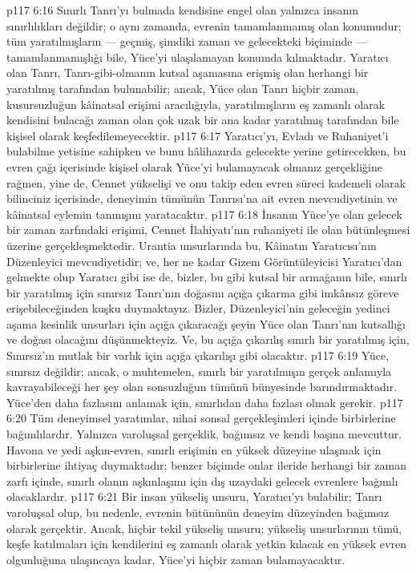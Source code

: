 \vs p117 6:16 Sınırlı Tanrı’yı bulmada kendisine engel olan yalnızca insanın sınırlılıkları değildir; o aynı zamanda, evrenin tamamlanmamış olan konumudur; tüm yaratılmışların --- geçmiş, şimdiki zaman ve gelecekteki biçiminde --- tamamlanmamışlığı bile, Yüce’yi ulaşılamayan konumda kılmaktadır. Yaratıcı olan Tanrı, Tanrı\hyp{}gibi\hyp{}olmanın kutsal aşamasına erişmiş olan herhangi bir yaratılmış tarafından bulunabilir; ancak, Yüce olan Tanrı hiçbir zaman, kusursuzluğun kâinatsal erişimi aracılığıyla,  yaratılmışların eş zamanlı olarak kendisini bulacağı zaman olan çok uzak bir ana kadar  yaratılmış tarafından bile kişisel olarak keşfedilemeyecektir.
\vs p117 6:17 Yaratıcı’yı, Evladı ve Ruhaniyet’i bulabilme yetisine sahipken ve bunu hâlihazırda gelecekte yerine getirecekken, bu evren çağı içerisinde kişisel olarak Yüce’yi bulamayacak olmanız gerçekliğine rağmen, yine de, Cennet yükselişi ve onu takip eden evren süreci kademeli olarak bilinciniz içerisinde, deneyimin tümünün Tanrısı’na ait evren mevcudiyetinin ve kâinatsal eylemin tanınışını yaratacaktır.
\vs p117 6:18 İnsanın Yüce’ye olan gelecek bir zaman zarfındaki erişimi, Cennet İlahiyatı’nın ruhaniyeti ile olan bütünleşmesi üzerine gerçekleşmektedir. Urantia unsurlarında bu, Kâinatın Yaratıcısı’nın Düzenleyici mevcudiyetidir; ve, her ne kadar Gizem Görüntüleyicisi Yaratıcı’dan gelmekte olup Yaratıcı gibi ise de, bizler, bu gibi kutsal bir armağanın bile, sınırlı bir yaratılmış için sınırsız Tanrı’nın doğasını açığa çıkarma gibi imkânsız göreve erişebileceğinden kuşku duymaktayız. Bizler, Düzenleyici’nin geleceğin yedinci aşama kesinlik unsurları için açığa çıkaracağı şeyin Yüce olan Tanrı’nın kutsallığı ve doğası olacağını düşünmekteyiz. Ve, bu açığa çıkarılış sınırlı bir yaratılmış için, Sınırsız’ın mutlak bir varlık için açığa çıkarılışı gibi olacaktır.
\vs p117 6:19 Yüce, sınırsız değildir; ancak, o muhtemelen, sınırlı bir yaratılmışın gerçek anlamıyla kavrayabileceği her şey olan sonsuzluğun tümünü bünyesinde barındırmaktadır. Yüce’den daha fazlasını anlamak için, sınırlıdan daha fazlası olmak gerekir.
\vs p117 6:20 Tüm deneyimsel yaratımlar, nihai sonsal gerçekleşimleri içinde birbirlerine bağımlılardır. Yalnızca varoluşsal gerçeklik, bağımsız ve kendi başına mevcuttur. Havona ve yedi aşkın\hyp{}evren, sınırlı erişimin en yüksek düzeyine ulaşmak için birbirlerine ihtiyaç duymaktadır; benzer biçimde onlar ileride herhangi bir zaman zarfı içinde, sınırlı olanın aşkınlaşımı için dış uzaydaki gelecek evrenlere bağımlı olacaklardır.
\vs p117 6:21 Bir insan yükseliş unsuru, Yaratıcı’yı bulabilir; Tanrı varoluşsal olup, bu nedenle, evrenin bütününün deneyim düzeyinden bağımsız olarak gerçektir. Ancak, hiçbir tekil yükseliş unsuru; yükseliş unsurlarının tümü, keşfe katılmaları için kendilerini eş zamanlı olarak yetkin kılacak en yüksek evren olgunluğuna ulaşıncaya kadar, Yüce’yi hiçbir zaman bulamayacaktır.
